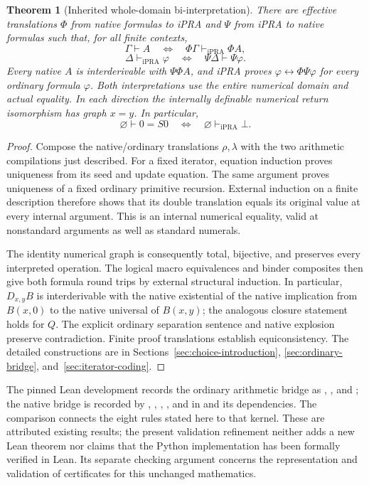 \documentclass[11pt,letterpaper]{article}
\newtheorem{theorem}{Theorem}[section]
\theoremstyle{definition}
\theoremstyle{remark}
\begin{document}
\begin{theorem}[Inherited whole-domain bi-interpretation]
\label{thm:inherited-biinterpretation}
There are effective translations $\Phi$ from native formulas to iPRA and
$\Psi$ from iPRA to native formulas such that, for all finite contexts,
\[
 \Gamma\vdash A
 \quad\Longleftrightarrow\quad
 \Phi\Gamma\vdash_{\mathrm{iPRA}}\Phi A,
\]
\[
 \Delta\vdash_{\mathrm{iPRA}}\varphi
 \quad\Longleftrightarrow\quad
 \Psi\Delta\vdash\Psi\varphi.
\]
Every native $A$ is interderivable with $\Psi\Phi A$, and iPRA proves
$\varphi\leftrightarrow\Phi\Psi\varphi$ for every ordinary formula
$\varphi$. Both interpretations use the entire numerical domain and actual
equality. In each direction the internally definable numerical return
isomorphism has graph $x=y$. In particular,
\[
 \varnothing\vdash 0=S0
 \quad\Longleftrightarrow\quad
 \varnothing\vdash_{\mathrm{iPRA}}\bot.
\]
\end{theorem}

\begin{proof}
Compose the native/ordinary translations $\rho,\lambda$ with the two
arithmetic compilations just described. For a fixed iterator, equation
induction proves uniqueness from its seed and update equation. The same
argument proves uniqueness of a fixed ordinary primitive recursion.
External induction on a finite description therefore shows that its double
translation equals its original value at every internal argument. This is
an internal numerical equality, valid at nonstandard arguments as well as
standard numerals.

The identity numerical graph is consequently total, bijective, and preserves
every interpreted operation. The logical macro equivalences and binder
composites then give both formula round trips by external structural
induction. In particular, $D_{x,y}B$ is interderivable with the native
existential of the native implication from $B(x,0)$ to the native universal
of $B(x,y)$; the analogous closure statement holds for $Q$. The explicit
ordinary separation sentence and native explosion preserve contradiction.
Finite proof translations establish equiconsistency. The detailed
constructions are in Sections~\ref{sec:choice-introduction},
\ref{sec:ordinary-bridge}, and~\ref{sec:iterator-coding}.
\end{proof}

The pinned Lean development records the ordinary arithmetic bridge as
, , and
; the native bridge is recorded by
, ,
, , and
 in
 and its dependencies.
The comparison  connects the eight rules stated here
to that kernel. These are attributed existing results; the present
validation refinement neither adds a new Lean theorem nor claims that the
Python implementation has been formally verified in Lean. Its separate
checking argument concerns the representation and validation of certificates
for this unchanged mathematics.
\end{document}
